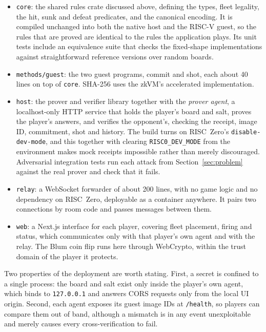 \documentclass[11pt,a4paper]{article}
\newcommand{\code}[1]{\texttt{\small #1}}
\begin{document}
\begin{itemize}[noitemsep,topsep=2pt]
\item \code{core}: the shared rules crate discussed above, defining the types,
      fleet legality, the hit, sunk and defeat predicates, and the canonical
      encoding. It is compiled unchanged into both the native host and the
      RISC-V guest, so the rules that are proved are identical to the rules the
      application plays. Its unit tests include an equivalence suite that checks
      the fixed-shape implementations against straightforward reference versions
      over random boards.
\item \code{methods/guest}: the two guest programs, \textsf{commit} and
      \textsf{shot}, each about 40 lines on top of \code{core}. SHA-256 uses
      the zkVM's accelerated implementation.
\item \code{host}: the prover and verifier library together with the
      \emph{prover agent}, a localhost-only HTTP service that holds the
      player's board and salt, proves the player's answers, and verifies the
      opponent's, checking the receipt, image ID, commitment, shot and history.
      The build turns on RISC~Zero's \code{disable-dev-mode}, and this together
      with clearing \code{RISC0\_DEV\_MODE} from the environment makes mock
      receipts impossible rather than merely discouraged. Adversarial
      integration tests run each attack from Section~\ref{sec:problem} against
      the real prover and check that it fails.
\item \code{relay}: a WebSocket forwarder of about 200 lines, with no game
      logic and no dependency on RISC~Zero, deployable as a container anywhere.
      It pairs two connections by room code and passes messages between them.
\item \code{web}: a Next.js interface for each player, covering fleet
      placement, firing and status, which communicates only with that player's
      own agent and with the relay. The Blum coin flip runs here through
      WebCrypto, within the trust domain of the player it protects.
\end{itemize}

Two properties of the deployment are worth stating. First, a secret is confined
to a single process: the board and salt exist only inside the player's own
agent, which binds to \code{127.0.0.1} and answers CORS requests only from the
local UI origin. Second, each agent exposes its guest image IDs at
\code{/health}, so players can compare them out of band, although a mismatch is
in any event unexploitable and merely causes every cross-verification to fail.
\end{document}
